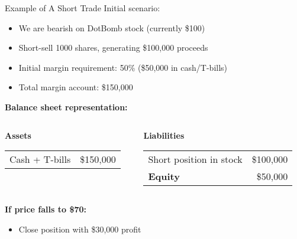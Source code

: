 \documentclass[10pt,handout]{beamer}
\begin{document}
\begin{frame}{Example of A Short Trade}
  Initial scenario:
  \begin{itemize}
    \item We are bearish on DotBomb stock (currently \$100)
    \item Short-sell 1000 shares, generating \$100,000 proceeds
    \item Initial margin requirement: 50\% (\$50,000 in cash/T-bills)
    \item Total margin account: \$150,000
  \end{itemize}
  
  \pause
  \textbf{Balance sheet representation:}
  \begin{columns}
    \begin{column}{0.48\textwidth}
      \textbf{Assets} \vspace{0.2em}\\
      \begin{tabular}{lr}
        Cash + T-bills & \$150,000 \\
      \end{tabular}
    \end{column}
    \begin{column}{0.48\textwidth}
      \textbf{Liabilities} \vspace{0.2em}\\
      \begin{tabular}{lr}
        Short position in stock & \$100,000 \\[0.5em]
        \textbf{Equity} & \$50,000 \\
      \end{tabular}
    \end{column}
  \end{columns}
  
  \pause
  \textbf{If price falls to \$70:}
  \begin{itemize}
    \item Close position with \$30,000 profit
  \end{itemize}
  

\end{frame}
\end{document}

